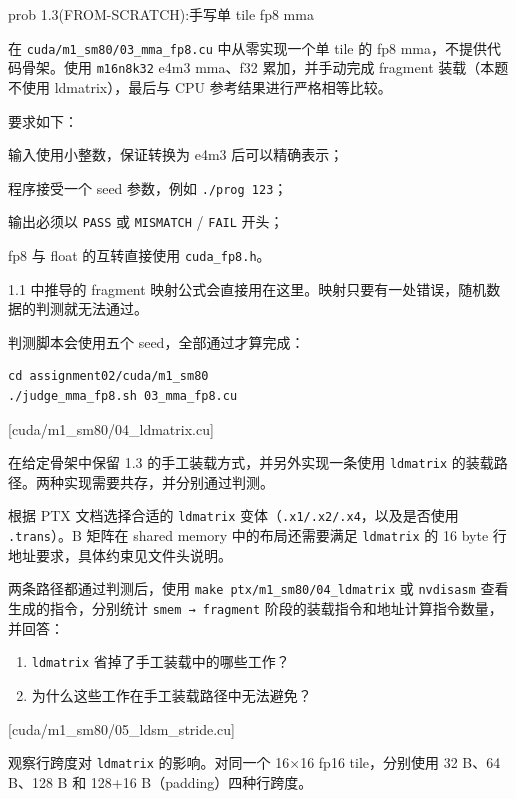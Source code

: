 \documentclass[11pt,a4paper,fontset=fandol]{ctexart}
\begin{document}
\begin{capstone}{prob 1.3(FROM-SCRATCH):手写单 tile fp8 mma}

在 \texttt{cuda/m1\_sm80/03\_mma\_fp8.cu} 中从零实现一个单 tile 的 fp8
mma，不提供代码骨架。使用 \texttt{m16n8k32} e4m3 mma、f32
累加，并手动完成 fragment 装载（本题不使用 ldmatrix），最后与 CPU
参考结果进行严格相等比较。

要求如下：

输入使用小整数，保证转换为 e4m3 后可以精确表示；

程序接受一个 seed 参数，例如 \texttt{./prog\ 123}；

输出必须以 \texttt{PASS} 或 \texttt{MISMATCH} / \texttt{FAIL} 开头；

fp8 与 float 的互转直接使用 \texttt{cuda\_fp8.h}。

1.1 中推导的 fragment
映射公式会直接用在这里。映射只要有一处错误，随机数据的判测就无法通过。

判测脚本会使用五个 seed，全部通过才算完成：

\begin{verbatim}
cd assignment02/cuda/m1_sm80
./judge_mma_fp8.sh 03_mma_fp8.cu
\end{verbatim}

\end{capstone}

[cuda/m1\_sm80/04\_ldmatrix.cu]

在给定骨架中保留 1.3 的手工装载方式，并另外实现一条使用
\texttt{ldmatrix} 的装载路径。两种实现需要共存，并分别通过判测。

根据 PTX 文档选择合适的 \texttt{ldmatrix}
变体（\texttt{.x1/.x2/.x4}，以及是否使用 \texttt{.trans}）。B 矩阵在
shared memory 中的布局还需要满足 \texttt{ldmatrix} 的 16 byte
行地址要求，具体约束见文件头说明。

两条路径都通过判测后，使用 \texttt{make\ ptx/m1\_sm80/04\_ldmatrix} 或
\texttt{nvdisasm} 查看生成的指令，分别统计 \texttt{smem\ →\ fragment}
阶段的装载指令和地址计算指令数量，并回答：

\begin{enumerate}
\def\labelenumi{(\alph{enumi})}
\item
  \texttt{ldmatrix} 省掉了手工装载中的哪些工作？
\item
  为什么这些工作在手工装载路径中无法避免？
\end{enumerate}

[cuda/m1\_sm80/05\_ldsm\_stride.cu]

观察行跨度对 \texttt{ldmatrix} 的影响。对同一个 16×16 fp16
tile，分别使用 32 B、64 B、128 B 和 128+16 B（padding）四种行跨度。
\end{document}
